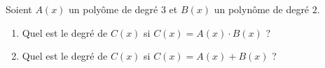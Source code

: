 %
%
    Soient $A(x)$ un polyôme de degré $3$ et $B(x)$ un polynôme de degré $2$.
    \begin{enumerate}
        \item Quel est le degré de $C(x)$ si $C(x) = A(x)\cdot B(x)$ ? \blank[width=1cm]{}
        \item Quel est le degré de $C(x)$ si $C(x) = A(x) +  B(x)$ ?
              \blank[width=1cm]{}
    \end{enumerate}
